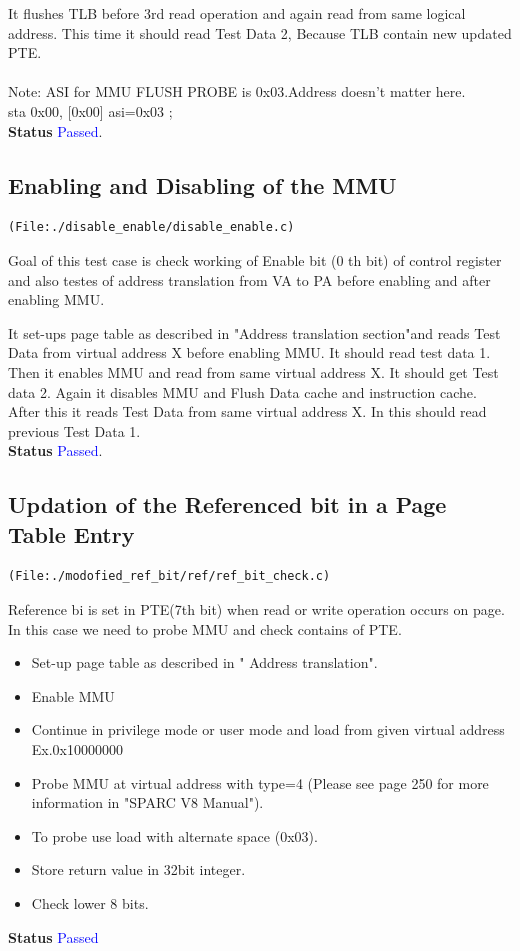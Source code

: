 \documentclass[12pt,a4paper]{article}
\begin{document}
It flushes TLB before 3rd read operation and again read from same logical address. This time it should read Test Data 2, Because TLB contain new updated PTE. \\ \\
Note: ASI for MMU FLUSH PROBE is 0x03.Address doesn't matter here.\\
sta 0x00, [0x00] asi=0x03 ;\\
\textbf{Status} \textcolor{blue}{Passed}.
 
\subsection{Enabling and Disabling of the MMU}
\begin{lstlisting}
(File:./disable_enable/disable_enable.c)
\end{lstlisting}

Goal of this test case is check working of Enable bit (0 th bit) of control register and also testes of address translation from VA to PA before enabling and after enabling MMU.

It set-ups page table as described in "Address translation section"and reads Test Data from virtual address X before enabling MMU. It should read test data 1. Then it enables MMU and read from same virtual address X. It should get Test data 2. Again it disables MMU and Flush Data cache and instruction cache. After this it reads Test Data from same virtual address X. In this should read previous Test Data 1.\\
 \textbf{Status} \textcolor{blue}{Passed}.

\subsection{Updation of the Referenced bit in a Page Table Entry}
\begin{lstlisting}
(File:./modofied_ref_bit/ref/ref_bit_check.c)
\end{lstlisting}
Reference bi is set in PTE(7th bit) when read or write operation occurs on page.
In this case we need to probe MMU and check contains of PTE.
\begin{itemize}
\item Set-up page table as described in " Address translation". 
\item Enable MMU
\item Continue in privilege mode or user mode  and load from given virtual address Ex.0x10000000 
\item Probe MMU at virtual address with type=4 (Please see page 250 for more information in "SPARC V8 Manual"). 
\item To probe use load with alternate space (0x03).
\item Store return value in 32bit integer.
\item Check lower 8 bits.
\end{itemize}
\textbf{Status} \textcolor{blue}{Passed}
 
\end{document}
